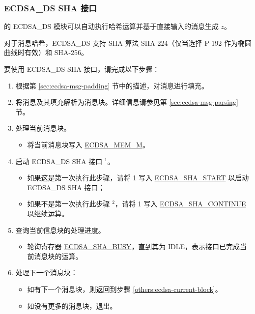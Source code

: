 \documentclass[main\_\_CN.tex]{subfiles}
\begin{document}
\subsubsection{ECDSA\_DS SHA 接口}
\label{sec:ecdsa-sha-interface}

\chipseries{} 的 ECDSA\_DS 模块可以自动执行哈希运算并基于直接输入的消息生成 $z$。

对于消息哈希，ECDSA\_DS 支持 SHA 算法 SHA-224（仅当选择 P-192 作为椭圆曲线时有效）和 SHA-256。

要使用 ECDSA\_DS SHA 接口，请完成以下步骤：

\begin{enumerate}
	\item 根据第 \ref{sec:ecdsa-msg-padding} 节中的描述，对消息进行填充。
	\item 将消息及其填充解析为消息块。详细信息请参见第 \ref{sec:ecdsa-msg-parsing} 节。
	\item \label{others:ecdsa-current-block} 处理当前消息块。
	      \begin{itemize}
		      \item 将当前消息块写入 \hyperref[tab:ecdsa-memory]{ECDSA\_MEM\_M}。
	      \end{itemize}
	\item 启动 ECDSA\_DS SHA 接口 \hyperref[others:ecdsa-note-sha]{$^1$}。
	      \begin{itemize}
		      \item 如果这是第一次执行此步骤，请将 1 写入 \hyperref[fielddesc:ECDSASHASTART]{ECDSA\_SHA\_START} 以启动 ECDSA\_DS SHA 接口；
		      \item 如果不是第一次执行此步骤 \hyperref[others:ecdsa-note-sha]{$^2$}，请将 1 写入 \hyperref[fielddesc:ECDSASHACONTINUE]{ECDSA\_SHA\_CONTINUE} 以继续运算。
	      \end{itemize}
	\item 查询当前信息块的处理进度。
	      \begin{itemize}
		      \item 轮询寄存器 \hyperref[fielddesc:ECDSASHABUSY]{ECDSA\_SHA\_BUSY}，直到其为 IDLE，表示接口已完成当前消息块的运算。
	      \end{itemize}

	\item 处理下一个消息块：
	      \begin{itemize}
		      \item 如有下一个消息块，则返回到步骤 \ref{others:ecdsa-current-block}。
		      \item 如没有更多的消息块，退出。
	      \end{itemize}

\end{enumerate}
\end{document}
